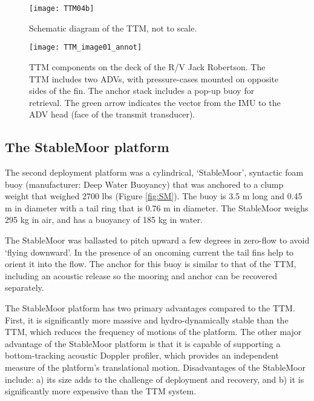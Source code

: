 \begin{figure}[t]
  \centering
  \texttt{[image: TTM04b]}
  \caption{Schematic diagram of the TTM, not to scale.}
  \label{fig:ttm:diagram}
\end{figure}

\begin{figure}[t]
  \centering
  \texttt{[image: TTM\_image01\_annot]}
  \caption{TTM components on the deck of the R/V Jack Robertson. The TTM includes two ADVs, with pressure-cases mounted on opposite sides of the fin. The anchor stack includes a pop-up buoy for retrieval. The green arrow indicates the vector from the IMU to the ADV head (face of the transmit transducer). }
  \label{fig:ttm:photo}
\end{figure}

\subsection{The StableMoor platform}

The second deployment platform was a cylindrical, `StableMoor', syntactic foam buoy (manufacturer: Deep Water Buoyancy) that was anchored to a clump weight that weighed 2700 lbs (Figure \ref{fig:SM}). The buoy is 3.5 m long and 0.45 m in diameter with a tail ring that is 0.76 m in diameter. The StableMoor weighs 295 kg in air, and has a buoyancy of 185 kg in water. 

The StableMoor was ballasted to pitch upward a few degrees in zero-flow to avoid `flying downward'. In the presence of an oncoming current the tail fins help to orient it into the flow. The anchor for this buoy is similar to that of the TTM, including an acoustic release so the mooring and anchor can be recovered separately.

The StableMoor platform has two primary advantages compared to the TTM. First, it is significantly more massive and hydro-dynamically stable than the TTM, which reduces the frequency of motions of the platform. The other major advantage of the StableMoor platform is that it is capable of supporting a bottom-tracking acoustic Doppler profiler, which provides an independent measure of the platform's translational motion. Disadvantages of the StableMoor include: a) its size adds to the challenge of deployment and recovery, and b) it is significantly more expensive than the TTM system.

